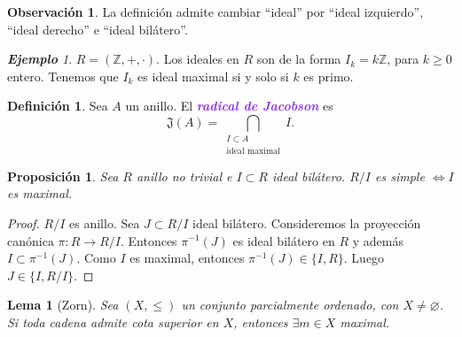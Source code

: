 \documentclass{article}
\newtheorem{proposition}[theorem]{Proposición}
\newtheorem{lemma}[theorem]{Lema}
\theoremstyle{definition}
\newtheorem{definition}[theorem]{Definición}
\newtheorem*{obs}{Observación}
\theoremstyle{remark}
\newtheorem{example}[theorem]{\textbf{Ejemplo}}
\numberwithin{equation}{section}
\newcommand{\Z}{\mathbb{Z}}
\renewcommand{\c}{\cdot}
\newcommand{\wea}[1]{\textcolor{BlueViolet}{\textbf{\emph{#1}}}}
\begin{document}
\begin{obs}
  La definición admite cambiar ``ideal'' por ``ideal izquierdo'', ``ideal derecho'' e ``ideal bilátero''.
\end{obs}

\begin{example}
  $R = (\Z,+,\c)$. Los ideales en $R$ son de la forma $I_k = k\Z$, para $k \geq 0$ entero. Tenemos que $I_k$ es ideal maximal si y solo si $k$ es primo.
\end{example}

\begin{definition}
  Sea $A$ un anillo. El \wea{radical de Jacobson} es 
  \[ \mathfrak{J}(A) = \bigcap_{\substack{I \subset A \\ \text{ideal maximal}}} I. \]
\end{definition}

\begin{proposition}
  Sea $R$ anillo no trivial e $I \subset R$ ideal bilátero. $R/I$ es simple $\iff I$ es maximal.
\end{proposition}
\begin{proof}
  $R/I$ es anillo. Sea $J \subset R/I$ ideal bilátero. Consideremos la proyección canónica $\pi \colon R \to R/I$. Entonces $\pi^{-1}(J)$ es ideal bilátero en $R$ y además $I \subset \pi^{-1}(J)$.
  Como $I$ es maximal, entonces $\pi^{-1}(J) \in \{I,R\}$. Luego $J \in \{I,R/I\}$.
\end{proof}

\begin{lemma}
  [Zorn] Sea $(X,\leq)$ un conjunto parcialmente ordenado, con $X \neq \varnothing$.
  Si toda cadena admite cota superior en $X$, entonces $\exists m \in X$ maximal.
\end{lemma}
\end{document}
